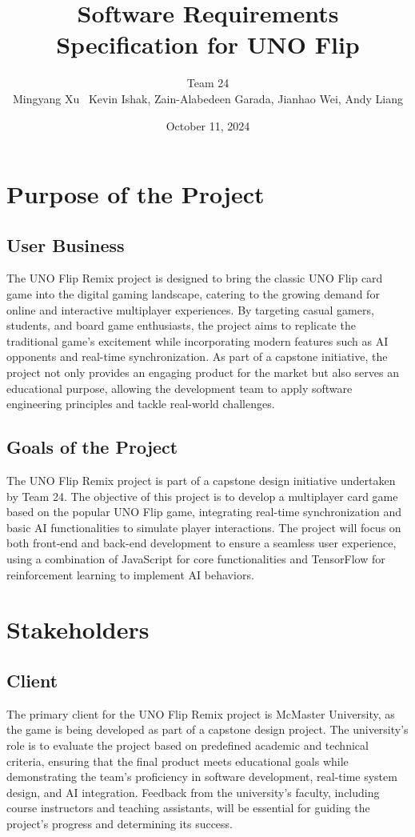 \documentclass{article}
\title{Software Requirements Specification for UNO Flip}
\author{Team 24 \\ Mingyang Xu \ Kevin Ishak, Zain-Alabedeen Garada, Jianhao Wei, Andy Liang}
\date{October 11, 2024}
\begin{document}
\maketitle

\tableofcontents

\section{Purpose of the Project}

\subsection{User Business}
The UNO Flip Remix project is designed to bring the classic UNO Flip card game into the digital gaming landscape, catering to the growing demand for online and interactive multiplayer experiences. By targeting casual gamers, students, and board game enthusiasts, the project aims to replicate the traditional game's excitement while incorporating modern features such as AI opponents and real-time synchronization. As part of a capstone initiative, the project not only provides an engaging product for the market but also serves an educational purpose, allowing the development team to apply software engineering principles and tackle real-world challenges.

\subsection{Goals of the Project}
The UNO Flip Remix project is part of a capstone design initiative undertaken by Team 24. The objective of this project is to develop a multiplayer card game based on the popular UNO Flip game, integrating real-time synchronization and basic AI functionalities to simulate player interactions. The project will focus on both front-end and back-end development to ensure a seamless user experience, using a combination of JavaScript for core functionalities and TensorFlow for reinforcement learning to implement AI behaviors.

\section{Stakeholders}

\subsection{Client}
The primary client for the UNO Flip Remix project is McMaster University, as the game is being developed as part of a capstone design project. The university's role is to evaluate the project based on predefined academic and technical criteria, ensuring that the final product meets educational goals while demonstrating the team's proficiency in software development, real-time system design, and AI integration. Feedback from the university's faculty, including course instructors and teaching assistants, will be essential for guiding the project's progress and determining its success.
\end{document}

